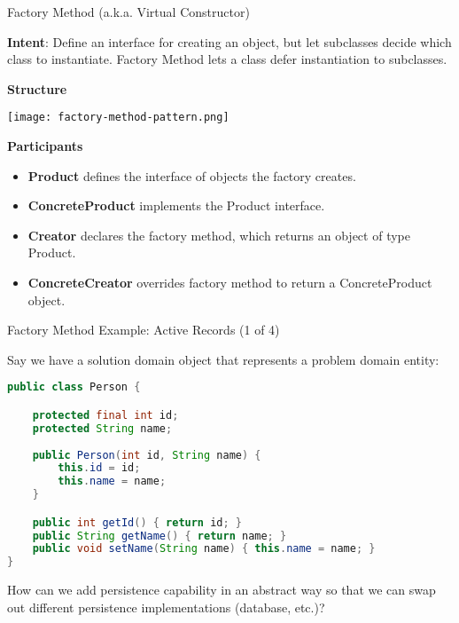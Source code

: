 \documentclass{beamer}
\begin{document}
\begin{frame}[fragile]{Factory Method (a.k.a. Virtual Constructor)}

\vspace{-.05in}
{\bf Intent}: Define an interface for creating an object, but let subclasses decide which class to instantiate. Factory Method lets a class defer instantiation to subclasses.

{\bf Structure}
\vspace{-.1in}
\begin{center}
\texttt{[image: factory-method-pattern.png]}\\
\end{center}
\vspace{-.2in}
{\bf Participants}
\begin{itemize}
\item {\bf Product} defines the interface of objects the factory creates.
\item {\bf ConcreteProduct} implements the Product interface.
\item {\bf Creator} declares the factory method, which returns an object of type Product.
\item {\bf ConcreteCreator} overrides factory method to return a ConcreteProduct object.
\end{itemize}


\end{frame}

\begin{frame}[fragile]{Factory Method Example: Active Records (1 of 4)}


Say we have a solution domain object that represents a problem domain entity:
\begin{lstlisting}[language=Java]
public class Person {

    protected final int id;
    protected String name;
   
    public Person(int id, String name) {
        this.id = id;
        this.name = name;
    }

    public int getId() { return id; }
    public String getName() { return name; }
    public void setName(String name) { this.name = name; }
}
\end{lstlisting}
How can we add persistence capability in an abstract way so that we can swap out different persistence implementations (database, etc.)?

\end{frame}
\end{document}
